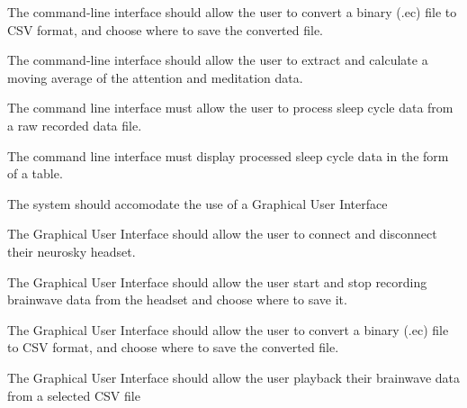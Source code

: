 \begin{reqtable}
  {The command-line interface should allow the user to convert a binary (.ec) file to CSV format,
    and choose where to save the converted file.}
  \phigh
  \deps{\ref{sreq:facilitate-conversion}}

  {The command-line interface should allow the user to extract and calculate a moving average of the
    attention and meditation data.}
  \phigh
  \deps{\ref{sreq:calculate-moving-average}}

  {The command line interface must allow the user to process sleep cycle data from a raw recorded
    data file.}
  \phigh
  \deps{\ref{sreq:extract-sleep-percentage}}

  {The command line interface must display processed sleep cycle data in the form of a table.}
  \phigh
  \deps{\ref{req:apply-sorting-algorithm}}

  {The system should accomodate the use of a Graphical User Interface}
  \phigh
  \deps{\ref{sreq:allow-GUIuser-connect-disconnect},\ref{sreq:allow-GUIuser-record-data},\ref{sreq:specifystart-time-record},\ref{sreq:specifystop-time-record},
  \ref{sreq:GUIallow-user-change-format},\ref{sreq:GUI-process-sleep-data},\ref{sreq:GUI-sort-display},
  \ref{sreq:GUI-viewGraph},\ref{sreq:GUI-ManageGoal}}

  {The Graphical User Interface should allow the user to connect and disconnect their neurosky headset.}
  \phigh
  \deps{\ref{sreq:connect-headset},\ref{sreq:disconnect-headset}}

  {The Graphical User Interface should allow the user start and stop recording brainwave data
  from the headset and choose where to save it.}
  \phigh
  \deps{\ref{sreq:read-data-headset}, \ref{sreq:facilitate-saving}}

  {The Graphical User Interface should allow the user to convert a binary (.ec) file to CSV format,
    and choose where to save the converted file.}
  \phigh
  \deps{\ref{sreq:facilitate-conversion}}

  {The Graphical User Interface should allow the user playback their brainwave data from a selected CSV file}
  \phigh
  \deps{\ref{sreq:allow-GUIuser-record-data}}


\end{reqtable}
